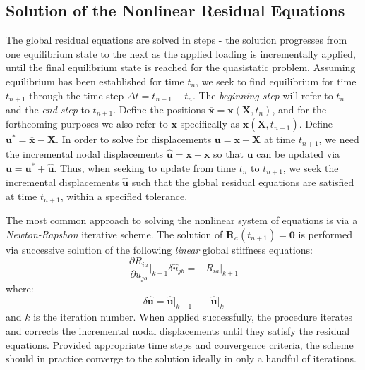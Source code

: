 \subsection{Solution of the Nonlinear Residual Equations}

The global residual equations are solved in steps - the solution progresses from one equilibrium state to the next as the applied loading is incrementally applied, until the final equilibrium state is reached for the quasistatic problem. Assuming equilibrium has been established for time $t_n$, we seek to find equilibrium for time $t_{n+1}$ through the time step $\Delta{t} = t_{n+1} - t_{n}$. The \textit{beginning step} will refer to $t_n$ and the \textit{end step} to $t_{n+1}$. Define the positions $\overline{\bm{x}} = \bm{x}(\bm{X},t_n)$, and for the forthcoming purposes we also refer to ${\bm{x}}$ specifically as $\bm{x}(\bm{X},t_{n+1})$. Define ${\bm{u}}^* = \overline{\bm{x}} - \bm{X}$. In order to solve for displacements $\bm{u} = \bm{x} - \bm{X}$ at time $t_{n+1}$, we need the incremental nodal displacements $\hat{\bm{u}} = \bm{x} - \overline{\bm{x}}$ so that $\bm{u}$ can be updated via $\bm{u} = {\bm{u}}^* + \hat{\bm{u}}$. Thus, when seeking to update from time $t_n$ to $t_{n+1}$, we seek the incremental displacements $\hat{\bm{u}}$ such that the global residual equations are satisfied at time $t_{n+1}$, within a specified tolerance.

The most common approach to solving the nonlinear system of equations is via a \textit{Newton-Rapshon} iterative scheme. The solution of $\bm{R}_a(t_{n+1}) = \bm{0}$ is performed via successive solution of the following \textit{linear} global stiffness equations:
\begin{equation}
\frac{\partial R_{ia}}{\partial \hat{u}_{jb}} \bigg|_{k+1} \delta\hat{u}_{jb} = -R_{ia}\bigg|_{k+1}
\label{eqn:newtonraphson}
\end{equation}
where:
\begin{equation}
\delta\hat{\bm{u}} = \hat{\bm{u}}\big|_{k+1} - \text{\ }\hat{\bm{u}}\big|_k
\end{equation}
and $k$ is the iteration number. When applied successfully, the procedure iterates and corrects the incremental nodal displacements until they satisfy the residual equations. Provided appropriate time steps and convergence criteria, the scheme should in practice converge to the solution ideally in only a handful of iterations.

